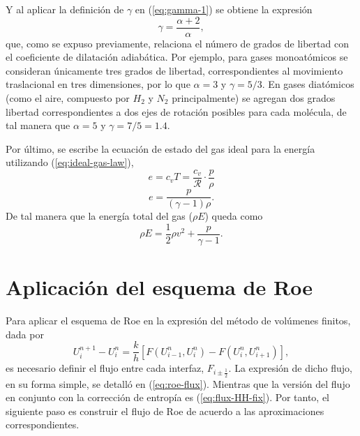 Y al aplicar la definición de $\gamma$ en (\ref{eq:gamma-1}) se obtiene la expresión
\begin{equation}
	\gamma = \frac{\alpha + 2}{\alpha},
\end{equation}
que, como se expuso previamente, relaciona el número de grados de libertad con el coeficiente de dilatación adiabática. Por ejemplo, para gases monoatómicos se consideran únicamente tres grados de libertad, correspondientes al movimiento traslacional en tres dimensiones, por lo que $\alpha = 3$ y $\gamma = 5/3$. En gases diatómicos (como el aire, compuesto por $H_2$ y $N_2$ principalmente) se agregan dos grados libertad correspondientes a dos ejes de rotación posibles para cada molécula, de tal manera que $\alpha = 5$ y $\gamma = 7/5 = 1.4$.

Por último, se escribe la ecuación de estado del gas ideal para la energía utilizando  (\ref{eq:ideal-gas-law}),
\begin{equation}
	e = c_v T = \frac{c_v}{\mathcal{R}}\cdot\frac{p}{\rho}
\end{equation}
\begin{equation}
	e = \frac{p}{(\gamma - 1) \rho}.
\end{equation}
De tal manera que la energía total del gas ($\rho E$) queda como
\begin{equation}
	 \rho E = \frac{1}{2}\rho v^{2} + \frac{p}{\gamma - 1}.
	 \label{eq:energia-total}
\end{equation}
\section{Aplicación del esquema de Roe}
Para aplicar el esquema de Roe en la expresión del método de volúmenes finitos, dada por 
\begin{equation}
	U_{i}^{n+1}-U_{i}^{n} = 
	\frac{k}{h}\left[ F(U_{i-1}^n, U_i^n) - F(U_{i}^n, U_{i+1}^n) \right],
	\label{eq:metodo-vol-finitos-3}
\end{equation}
 es necesario definir el flujo entre cada interfaz, $F_{i\pm \frac{1}{2}}$. La expresión de dicho flujo, en su forma simple, se detalló en (\ref{eq:roe-flux}). Mientras que la versión del flujo en conjunto con la corrección de entropía es (\ref{eq:flux-HH-fix}). Por tanto, el siguiente paso es construir el flujo de Roe de acuerdo a las aproximaciones correspondientes.

